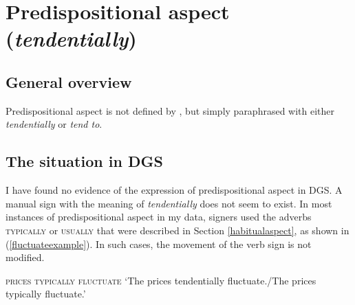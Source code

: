 %
%


\section{Predispositional aspect (\textit{tendentially})}
\subsection{General overview}
Predispositional aspect is not defined by \citet{cinque1999adverbs, cinque2006restructuring}, but simply paraphrased with either \textit{tendentially} or \textit{tend to}. 

\subsection{The situation in DGS}
I have found no evidence of the expression of predispositional aspect in DGS. A manual sign with the meaning of \textit{tendentially} does not seem to exist. In most instances of predispositional aspect in my data, signers used the adverbs \textsc{typically} or \textsc{usually} that were described in Section \ref{habitualaspect}, as shown in (\ref{fluctuateexample}). In such cases, the movement of the verb sign is not modified. 

\begin{exe}
\ex \textsc{prices typically fluctuate}
\glt `The prices tendentially fluctuate./The prices typically fluctuate.' \label{fluctuateexample}
\end{exe}

